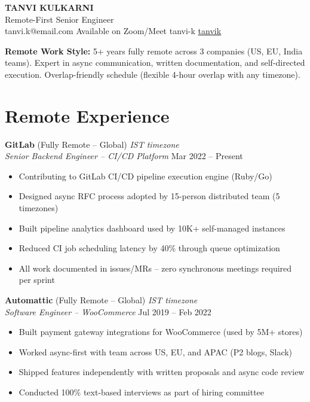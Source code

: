 \documentclass[10pt,letterpaper]{article}
\begin{document}
\begin{center}
{\LARGE\bfseries\color{remoteblue} TANVI KULKARNI}\\[4pt]
{\normalsize Remote-First Senior Engineer \quad {}\hspace{2pt}{\small IST (UTC+5:30) $\vert$ Flexible overlap with US/EU}}\\[6pt]
{\small {} tanvi.k@email.com \quad {} Available on Zoom/Meet \quad {} tanvi-k \quad {} \href{https://github.com/tanvik}{tanvik}}
\end{center}

\vspace{4pt}
\begin{tcolorbox}
\hspace{4pt}\textbf{Remote Work Style:} 5+ years fully remote across 3 companies (US, EU, India teams). Expert in async communication, written documentation, and self-directed execution. Overlap-friendly schedule (flexible 4-hour overlap with any timezone).
\end{tcolorbox}

\section{Remote Experience}

\textbf{GitLab} (Fully Remote -- Global) \hfill \textit{IST timezone}\\
\textit{Senior Backend Engineer -- CI/CD Platform} \hfill Mar 2022 -- Present
\begin{itemize}
\item Contributing to GitLab CI/CD pipeline execution engine (Ruby/Go)
\item Designed async RFC process adopted by 15-person distributed team (5 timezones)
\item Built pipeline analytics dashboard used by 10K+ self-managed instances
\item Reduced CI job scheduling latency by 40\% through queue optimization
\item All work documented in issues/MRs -- zero synchronous meetings required per sprint
\end{itemize}

\textbf{Automattic} (Fully Remote -- Global) \hfill \textit{IST timezone}\\
\textit{Software Engineer -- WooCommerce} \hfill Jul 2019 -- Feb 2022
\begin{itemize}
\item Built payment gateway integrations for WooCommerce (used by 5M+ stores)
\item Worked async-first with team across US, EU, and APAC (P2 blogs, Slack)
\item Shipped features independently with written proposals and async code review
\item Conducted 100\% text-based interviews as part of hiring committee
\end{itemize}
\end{document}

